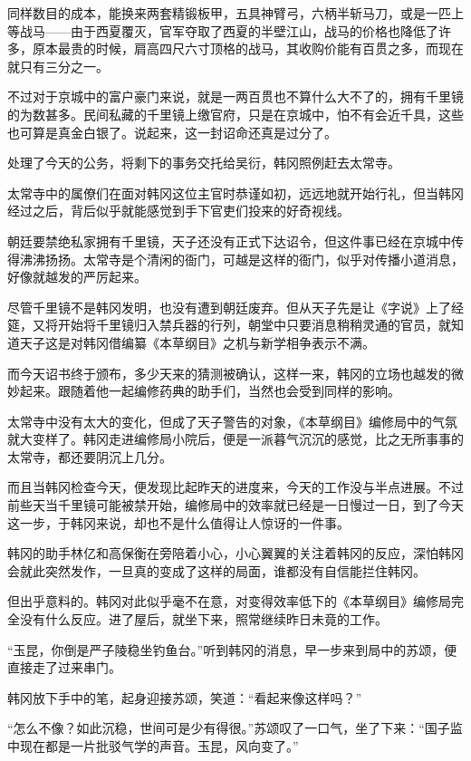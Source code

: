 同样数目的成本，能换来两套精锻板甲，五具神臂弓，六柄半斩马刀，或是一匹上等战马——由于西夏覆灭，官军夺取了西夏的半壁江山，战马的价格也降低了许多，原本最贵的时候，肩高四尺六寸顶格的战马，其收购价能有百贯之多，而现在就只有三分之一。

不过对于京城中的富户豪门来说，就是一两百贯也不算什么大不了的，拥有千里镜的为数甚多。民间私藏的千里镜上缴官府，只是在京城中，怕不有会近千具，这些也可算是真金白银了。说起来，这一封诏命还真是过分了。

处理了今天的公务，将剩下的事务交托给吴衍，韩冈照例赶去太常寺。

太常寺中的属僚们在面对韩冈这位主官时恭谨如初，远远地就开始行礼，但当韩冈经过之后，背后似乎就能感觉到手下官吏们投来的好奇视线。

朝廷要禁绝私家拥有千里镜，天子还没有正式下达诏令，但这件事已经在京城中传得沸沸扬扬。太常寺是个清闲的衙门，可越是这样的衙门，似乎对传播小道消息，好像就越发的严厉起来。

尽管千里镜不是韩冈发明，也没有遭到朝廷废弃。但从天子先是让《字说》上了经筵，又将开始将千里镜归入禁兵器的行列，朝堂中只要消息稍稍灵通的官员，就知道天子这是对韩冈借编纂《本草纲目》之机与新学相争表示不满。

而今天诏书终于颁布，多少天来的猜测被确认，这样一来，韩冈的立场也越发的微妙起来。跟随着他一起编修药典的助手们，当然也会受到同样的影响。

太常寺中没有太大的变化，但成了天子警告的对象，《本草纲目》编修局中的气氛就大变样了。韩冈走进编修局小院后，便是一派暮气沉沉的感觉，比之无所事事的太常寺，都还要阴沉上几分。

而且当韩冈检查今天，便发现比起昨天的进度来，今天的工作没与半点进展。不过前些天当千里镜可能被禁开始，编修局中的效率就已经是一日慢过一日，到了今天这一步，于韩冈来说，却也不是什么值得让人惊讶的一件事。

韩冈的助手林亿和高保衡在旁陪着小心，小心翼翼的关注着韩冈的反应，深怕韩冈会就此突然发作，一旦真的变成了这样的局面，谁都没有自信能拦住韩冈。

但出乎意料的。韩冈对此似乎毫不在意，对变得效率低下的《本草纲目》编修局完全没有什么反应。进了屋后，就坐下来，照常继续昨日未竟的工作。

“玉昆，你倒是严子陵稳坐钓鱼台。”听到韩冈的消息，早一步来到局中的苏颂，便直接走了过来串门。

韩冈放下手中的笔，起身迎接苏颂，笑道：“看起来像这样吗？”

“怎么不像？如此沉稳，世间可是少有得很。”苏颂叹了一口气，坐了下来：“国子监中现在都是一片批驳气学的声音。玉昆，风向变了。”

